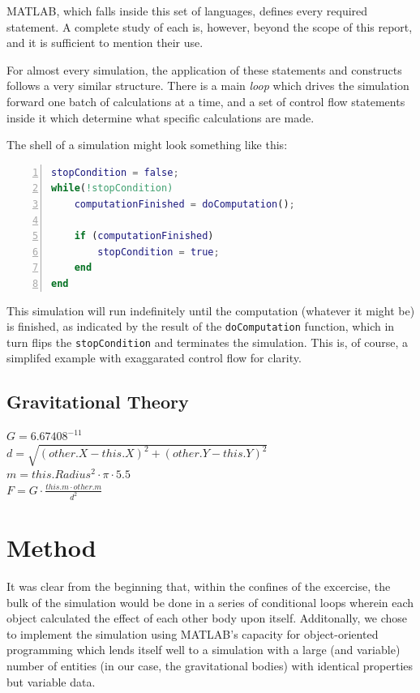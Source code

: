 \documentclass[11pt]{article}
\begin{document}
MATLAB, which falls inside this set of languages, defines every required statement. A complete study of each is, however, beyond the scope of this report, and it is sufficient to mention their use.

For almost every simulation, the application of these statements and constructs follows a very similar structure. There is a main \emph{loop} which drives the simulation forward one batch of calculations at a time, and a set of control flow statements inside it which determine what specific calculations are made.

The shell of a simulation might look something like this:
\begin{lstlisting}[language=Matlab, tabsize=4, numbers=left, frame=shadowbox]
stopCondition = false;
while(!stopCondition)
	computationFinished = doComputation();
	
	if (computationFinished)
		stopCondition = true;
	end
end
\end{lstlisting}
This simulation will run indefinitely until the computation (whatever it might be) is finished, as indicated by
the result of the \verb|doComputation| function, which in turn flips the \verb|stopCondition| and terminates the 
simulation. This is, of course, a simplifed example with exaggarated control flow for clarity.
\subsection{Gravitational Theory}
$G = 6.67408^{-11}$\\
$d = \sqrt{(other.X - this.X)^{2} + (other.Y - this.Y)^{2}}$\\
$m = this.Radius^{2} \cdot \pi \cdot 5.5$\\
$F = G \cdot \frac{this.m \cdot other.m}{d^{2}}$

\pagebreak
\section{Method}
It was clear from the beginning that, within the confines of the excercise, the bulk of the simulation would be done in a series of conditional loops wherein each object calculated the effect of each other body upon itself. Additonally, we chose to implement the simulation using MATLAB's capacity for object-oriented programming which lends itself well to a simulation with a large (and variable) number of entities (in our case, the gravitational bodies) with identical properties but variable data.
\end{document}
